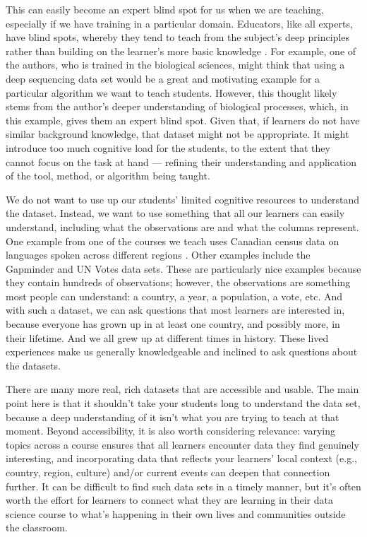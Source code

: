 \documentclass[
  10pt,
  letterpaper,
]{article}
\begin{document}
This can easily become an expert blind spot for us when we are teaching,
especially if we have training in a particular domain. Educators, like
all experts, have blind spots, whereby they tend to teach from the
subject's deep principles rather than building on the learner's more
basic knowledge \citep{nathan2003expert}. For example, one of the
authors, who is trained in the biological sciences, might think that
using a deep sequencing data set would be a great and motivating example
for a particular algorithm we want to teach students. However, this
thought likely stems from the author's deeper understanding of
biological processes, which, in this example, gives them an expert blind
spot. Given that, if learners do not have similar background knowledge,
that dataset might not be appropriate. It might introduce too much
cognitive load for the students, to the extent that they cannot focus on
the task at hand --- refining their understanding and application of the
tool, method, or algorithm being taught.

We do not want to use up our students' limited cognitive resources to
understand the dataset. Instead, we want to use something that all our
learners can easily understand, including what the observations are and
what the columns represent. One example from one of the courses we teach
uses Canadian census data on languages spoken across different regions
\citep{canlang}. Other examples include the Gapminder \citep{gapminder}
and UN Votes \citep{robinson2021unvotes} data sets. These are
particularly nice examples because they contain hundreds of
observations; however, the observations are something most people can
understand: a country, a year, a population, a vote, etc. And with such
a dataset, we can ask questions that most learners are interested in,
because everyone has grown up in at least one country, and possibly
more, in their lifetime. And we all grew up at different times in
history. These lived experiences make us generally knowledgeable and
inclined to ask questions about the datasets.

There are many more real, rich datasets that are accessible and usable.
The main point here is that it shouldn't take your students long to
understand the data set, because a deep understanding of it isn't what
you are trying to teach at that moment. Beyond accessibility, it is also
worth considering relevance: varying topics across a course ensures that
all learners encounter data they find genuinely interesting, and
incorporating data that reflects your learners' local context (e.g.,
country, region, culture) and/or current events can deepen that
connection further. It can be difficult to find such data sets in a
timely manner, but it's often worth the effort for learners to connect
what they are learning in their data science course to what's happening
in their own lives and communities outside the classroom.
\end{document}
